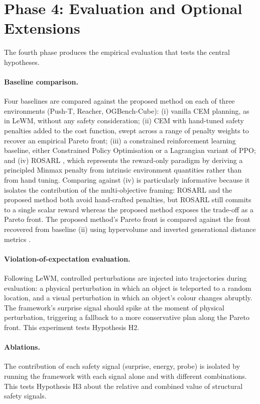 \documentclass[a4paper,twoside,12pt]{report}
\begin{document}
\section{Phase 4: Evaluation and Optional Extensions}

The fourth phase produces the empirical evaluation that tests the central hypotheses.

\paragraph{Baseline comparison.} Four baselines are compared against the proposed method on each of three environments (Push-T, Reacher, OGBench-Cube): (i) vanilla CEM planning, as in LeWM, without any safety consideration; (ii) CEM with hand-tuned safety penalties added to the cost function, swept across a range of penalty weights to recover an empirical Pareto front; (iii) a constrained reinforcement learning baseline, either Constrained Policy Optimisation \citep{achiam2017cpo} or a Lagrangian variant of PPO; and (iv) ROSARL \citep{nanguetasse2024rosarl}, which represents the reward-only paradigm by deriving a principled Minmax penalty from intrinsic environment quantities rather than from hand tuning. Comparing against (iv) is particularly informative because it isolates the contribution of the multi-objective framing: ROSARL and the proposed method both avoid hand-crafted penalties, but ROSARL still commits to a single scalar reward whereas the proposed method exposes the trade-off as a Pareto front. The proposed method's Pareto front is compared against the front recovered from baseline (ii) using hypervolume and inverted generational distance metrics \citep{riquelme2015performance}.

\paragraph{Violation-of-expectation evaluation.} Following LeWM, controlled perturbations are injected into trajectories during evaluation: a physical perturbation in which an object is teleported to a random location, and a visual perturbation in which an object's colour changes abruptly. The framework's surprise signal should spike at the moment of physical perturbation, triggering a fallback to a more conservative plan along the Pareto front. This experiment tests Hypothesis H2.

\paragraph{Ablations.} The contribution of each safety signal (surprise, energy, probe) is isolated by running the framework with each signal alone and with different combinations. This tests Hypothesis H3 about the relative and combined value of structural safety signals.
\end{document}
